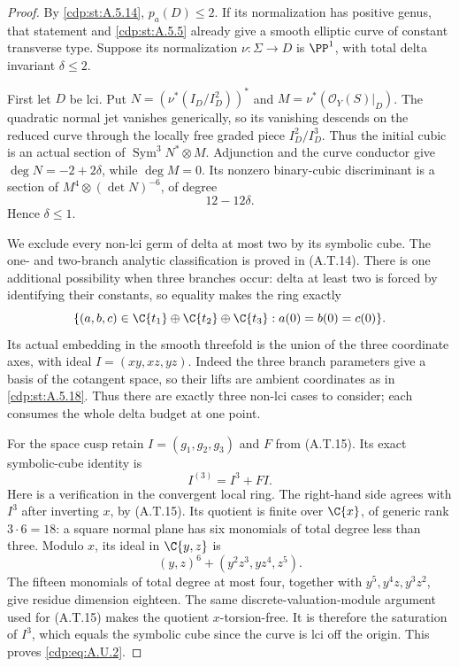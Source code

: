 \begin{proof}
By \ref{cdp:st:A.5.14}, $p_a(D)\le2$. If its normalization has
positive genus, that statement and \ref{cdp:st:A.5.5} already give
a smooth elliptic curve of constant transverse type.
Suppose its normalization $\nu:\Sigma\to D$ is
$\PP^1$, with total delta invariant $\delta\le2$.

First let $D$ be lci. Put
$N=(\nu^*(I_D/I_D^2))^*$ and
$M=\nu^*(\mathcal O_Y(S)|_D)$.
The quadratic normal jet vanishes generically, so
its vanishing descends on the reduced curve through
the locally free graded piece $I_D^2/I_D^3$.
Thus the initial cubic is an actual section of
$\operatorname{Sym}^3N^*\otimes M$.
Adjunction and the curve conductor give
$\deg N=-2+2\delta$, while $\deg M=0$.
Its nonzero binary-cubic discriminant is a section
of $M^4\otimes(\det N)^{-6}$, of degree
\[
                         12-12\delta.             \tag{A.U.1}\label{cdp:eq:A.U.1}
\]
Hence $\delta\le1$.

We exclude every non-lci germ of delta at most two
by its symbolic cube. The one- and two-branch analytic
classification is proved in (A.T.14). There is one
additional possibility when three branches occur:
delta at least two is forced by identifying their
constants, so equality makes the ring exactly
\[
 \{(a,b,c)\in\C\{t_1\}\oplus\C\{t_2\}\oplus\C\{t_3\}:
                      a(0)=b(0)=c(0)\}.
\]
Its actual embedding in the smooth threefold is the
union of the three coordinate axes, with ideal
$I=(xy,xz,yz)$. Indeed the three branch parameters
give a basis of the cotangent space, so their lifts
are ambient coordinates as in \ref{cdp:st:A.5.18}.
Thus there are exactly three non-lci cases to consider;
each consumes the whole delta budget at one point.

For the space cusp retain $I=(g_1,g_2,g_3)$ and
$F$ from (A.T.15). Its exact symbolic-cube identity is
\[
                         I^{(3)}=I^3+FI.           \tag{A.U.2}\label{cdp:eq:A.U.2}
\]
Here is a verification in the convergent local ring.
The right-hand side agrees with $I^3$ after inverting
$x$, by (A.T.15). Its quotient is finite over
$\C\{x\}$, of generic rank $3\cdot6=18$: a square
normal plane has six monomials of total degree less
than three. Modulo $x$, its ideal in $\C\{y,z\}$ is
\[
 (y,z)^6+(y^2z^3,yz^4,z^5).
\]
The fifteen monomials of total degree at most four,
together with $y^5,y^4z,y^3z^2$, give residue dimension
eighteen. The same discrete-valuation-module argument
used for (A.T.15) makes the quotient $x$-torsion-free.
It is therefore the saturation of $I^3$, which equals
the symbolic cube since the curve is lci off the origin.
This proves \eqref{cdp:eq:A.U.2}.


\end{proof}
